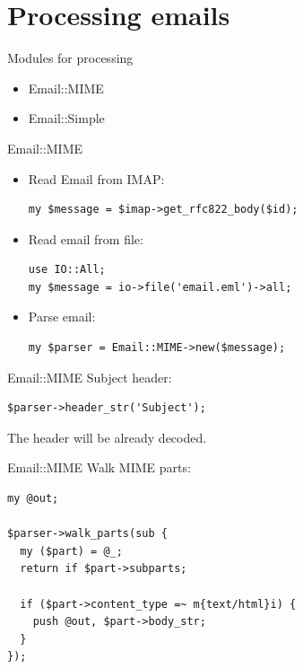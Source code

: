 \section{Processing emails}

\begin{frame}{Modules for processing}
  \begin{itemize}
  \item Email::MIME
  \item Email::Simple
  \end{itemize}
\end{frame}

\begin{frame}[fragile]{Email::MIME}
  \begin{itemize}
    \item Read Email from IMAP:

\begin{verbatim}
my $message = $imap->get_rfc822_body($id);
\end{verbatim}

  \item Read email from file:

\begin{verbatim}
use IO::All;
my $message = io->file('email.eml')->all;
\end{verbatim}

  \item Parse email:

\begin{verbatim}
my $parser = Email::MIME->new($message);
\end{verbatim}

\end{itemize}  
\end{frame}

\begin{frame}[fragile]{Email::MIME}
  Subject header:

\begin{verbatim}
$parser->header_str('Subject');
\end{verbatim}

\end{frame}

The header will be already decoded.

\begin{frame}[fragile]{Email::MIME}
Walk MIME parts:

\begin{verbatim}
my @out;

$parser->walk_parts(sub {
  my ($part) = @_;
  return if $part->subparts;

  if ($part->content_type =~ m{text/html}i) {
    push @out, $part->body_str;
  }
});
\end{verbatim}
\end{frame}

